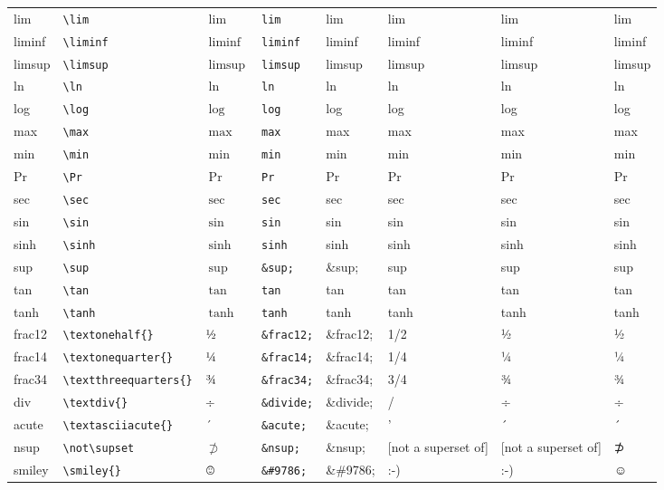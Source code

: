 \documentclass[11pt]{article}
\begin{document}
\begin{longtable}{llllllll}
lim & \texttt{\textbackslash{}lim} & $\lim$ & \texttt{lim} & lim & lim & lim & lim\\
liminf & \texttt{\textbackslash{}liminf} & $\liminf$ & \texttt{liminf} & liminf & liminf & liminf & liminf\\
limsup & \texttt{\textbackslash{}limsup} & $\limsup$ & \texttt{limsup} & limsup & limsup & limsup & limsup\\
ln & \texttt{\textbackslash{}ln} & $\ln$ & \texttt{ln} & ln & ln & ln & ln\\
log & \texttt{\textbackslash{}log} & $\log$ & \texttt{log} & log & log & log & log\\
max & \texttt{\textbackslash{}max} & $\max$ & \texttt{max} & max & max & max & max\\
min & \texttt{\textbackslash{}min} & $\min$ & \texttt{min} & min & min & min & min\\
Pr & \texttt{\textbackslash{}Pr} & $\Pr$ & \texttt{Pr} & Pr & Pr & Pr & Pr\\
sec & \texttt{\textbackslash{}sec} & $\sec$ & \texttt{sec} & sec & sec & sec & sec\\
sin & \texttt{\textbackslash{}sin} & $\sin$ & \texttt{sin} & sin & sin & sin & sin\\
sinh & \texttt{\textbackslash{}sinh} & $\sinh$ & \texttt{sinh} & sinh & sinh & sinh & sinh\\
sup & \texttt{\textbackslash{}sup} & $\sup$ & \texttt{\&sup;} & \&sup; & sup & sup & sup\\
tan & \texttt{\textbackslash{}tan} & $\tan$ & \texttt{tan} & tan & tan & tan & tan\\
tanh & \texttt{\textbackslash{}tanh} & $\tanh$ & \texttt{tanh} & tanh & tanh & tanh & tanh\\
frac12 & \texttt{\textbackslash{}textonehalf\{\}} & $\mbox{\textonehalf{}}$ & \texttt{\&frac12;} & \&frac12; & 1/2 & ½ & ½\\
frac14 & \texttt{\textbackslash{}textonequarter\{\}} & $\mbox{\textonequarter{}}$ & \texttt{\&frac14;} & \&frac14; & 1/4 & ¼ & ¼\\
frac34 & \texttt{\textbackslash{}textthreequarters\{\}} & $\mbox{\textthreequarters{}}$ & \texttt{\&frac34;} & \&frac34; & 3/4 & ¾ & ¾\\
div & \texttt{\textbackslash{}textdiv\{\}} & $\mbox{\textdiv{}}$ & \texttt{\&divide;} & \&divide; & / & ÷ & ÷\\
acute & \texttt{\textbackslash{}textasciiacute\{\}} & $\mbox{\textasciiacute{}}$ & \texttt{\&acute;} & \&acute; & ' & ´ & ´\\
nsup & \texttt{\textbackslash{}not\textbackslash{}supset} & $\not\supset$ & \texttt{\&nsup;} & \&nsup; & [not a superset of] & [not a superset of] & ⊅\\
smiley & \texttt{\textbackslash{}smiley\{\}} & $\mbox{\smiley{}}$ & \texttt{\&\#9786;} & \&\#9786; & :-) & :-) & ☺\\
\end{longtable}
\end{document}

